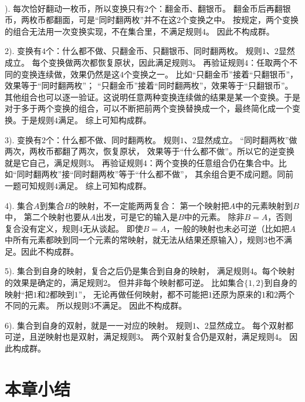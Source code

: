 \documentclass[12pt,UTF8,fontset=none]{ctexbook}
\begin{document}
\begin{so}
     \mbox{} \\
     ). 每次恰好翻动一枚币，所以变换只有$2$个：翻金币、翻银币。
     翻金币后再翻银币，两枚币都翻面，可是“同时翻两枚”并不在这$2$个变换之中。
     按规定，两个变换的组合无法用一次变换实现，不在集合里，不满足规则$4$。
     因此不构成群。

     2). 变换有$4$个：什么都不做、只翻金币、只翻银币、同时翻两枚。
     规则$1$、$2$显然成立。
     每个变换做两次都恢复原状，因此满足规则$3$。
     再验证规则$4$：任取两个不同的变换连续做，效果仍然是这$4$个变换之一。
     比如“只翻金币”接着“只翻银币”，效果等于“同时翻两枚”；
     “只翻金币”接着“同时翻两枚”，效果等于“只翻银币”。
     其他组合也可以逐一验证。这说明任意两种变换连续做的结果是某一个变换。于是对于多于两个变换的组合，可以不断把前两个变换替换成一个，最终简化成一个变换。于是规则$4$满足。
     综上可知构成群。

     3). 变换有$2$个：什么都不做、同时翻两枚。
     规则$1$、$2$显然成立。
     “同时翻两枚”做两次，两枚币都翻了两次，恢复原状，
     效果等于“什么都不做”。所以它的逆变换就是它自己，满足规则$3$。
     再验证规则$4$：两个变换的任意组合仍在集合中。比如“同时翻两枚”接“同时翻两枚”等于“什么都不做”，
     其余组合更不成问题。同前一题可知规则$4$满足。
     综上可知构成群。

     4). 集合$A$到集合$B$的映射，不一定能两两复合：
     第一个映射把$A$中的元素映射到$B$中，
     第二个映射也要从$A$出发，可是它的输入是$B$中的元素。
     除非$B = A$，否则复合没有定义，规则$4$无从谈起。
     即使$B = A$，一般的映射也未必可逆（比如把$A$中所有元素都映到同一个元素的常映射，就无法从结果还原输入），规则$3$也不满足。因此不构成群。

     5). 集合到自身的映射，复合之后仍是集合到自身的映射，
     满足规则$4$。每个映射的效果是确定的，满足规则$2$。
     但并非每个映射都可逆。
     比如集合$\{1,2\}$到自身的映射“把$1$和$2$都映到$1$”，
     无论再做任何映射，都不可能把$1$还原为原来的$1$和$2$两个不同的元素。
     所以规则$3$不满足。
     因此不构成群。

     6). 集合到自身的双射，就是一一对应的映射。
     规则$1$、$2$显然成立。
     每个双射都可逆，且逆映射也是双射，满足规则$3$。
     两个双射复合仍是双射，满足规则$4$。
     因此构成群。
\end{so}

\clearpage
\section*{本章小结}
\end{document}
